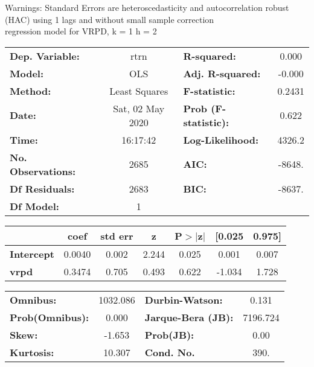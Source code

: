 Warnings: \newline
 [1] Standard Errors are heteroscedasticity and autocorrelation robust (HAC) using 1 lags and without small sample correction\\ 

regression model for VRPD, k = 1 h = 2\begin{center}
\begin{tabular}{lclc}
\toprule
\textbf{Dep. Variable:}    &       rtrn       & \textbf{  R-squared:         } &     0.000   \\
\textbf{Model:}            &       OLS        & \textbf{  Adj. R-squared:    } &    -0.000   \\
\textbf{Method:}           &  Least Squares   & \textbf{  F-statistic:       } &    0.2431   \\
\textbf{Date:}             & Sat, 02 May 2020 & \textbf{  Prob (F-statistic):} &    0.622    \\
\textbf{Time:}             &     16:17:42     & \textbf{  Log-Likelihood:    } &    4326.2   \\
\textbf{No. Observations:} &        2685      & \textbf{  AIC:               } &    -8648.   \\
\textbf{Df Residuals:}     &        2683      & \textbf{  BIC:               } &    -8637.   \\
\textbf{Df Model:}         &           1      & \textbf{                     } &             \\
\bottomrule
\end{tabular}
\begin{tabular}{lcccccc}
                   & \textbf{coef} & \textbf{std err} & \textbf{z} & \textbf{P$> |$z$|$} & \textbf{[0.025} & \textbf{0.975]}  \\
\midrule
\textbf{Intercept} &       0.0040  &        0.002     &     2.244  &         0.025        &        0.001    &        0.007     \\
\textbf{vrpd}      &       0.3474  &        0.705     &     0.493  &         0.622        &       -1.034    &        1.728     \\
\bottomrule
\end{tabular}
\begin{tabular}{lclc}
\textbf{Omnibus:}       & 1032.086 & \textbf{  Durbin-Watson:     } &    0.131  \\
\textbf{Prob(Omnibus):} &   0.000  & \textbf{  Jarque-Bera (JB):  } & 7196.724  \\
\textbf{Skew:}          &  -1.653  & \textbf{  Prob(JB):          } &     0.00  \\
\textbf{Kurtosis:}      &  10.307  & \textbf{  Cond. No.          } &     390.  \\
\bottomrule
\end{tabular}
\end{center}

